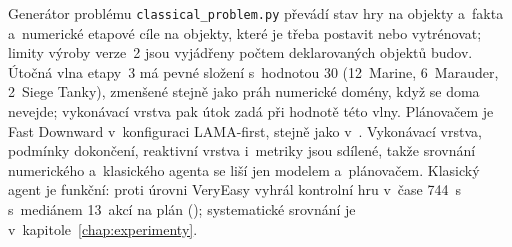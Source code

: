 Generátor problému \texttt{classical\_problem.py} převádí stav hry na objekty a~fakta a~numerické etapové cíle na objekty, které je třeba postavit nebo vytrénovat; limity výroby verze~2 jsou vyjádřeny počtem deklarovaných objektů budov. Útočná vlna etapy~3 má pevné složení s~hodnotou 30 (12~Marine, 6~Marauder, 2~Siege Tanky), zmenšené stejně jako práh numerické domény, když se doma nevejde; vykonávací vrstva pak útok zadá při hodnotě této vlny. Plánovačem je Fast Downward v~konfiguraci LAMA-first, stejně jako v~\cite{Orava2025}. Vykonávací vrstva, podmínky dokončení, reaktivní vrstva i~metriky jsou sdílené, takže srovnání numerického a~klasického agenta se liší jen modelem a~plánovačem. Klasický agent je funkční: proti úrovni VeryEasy vyhrál kontrolní hru v~čase 744~s s~mediánem 13~akcí na plán (); systematické srovnání je v~kapitole~\ref{chap:experimenty}.
